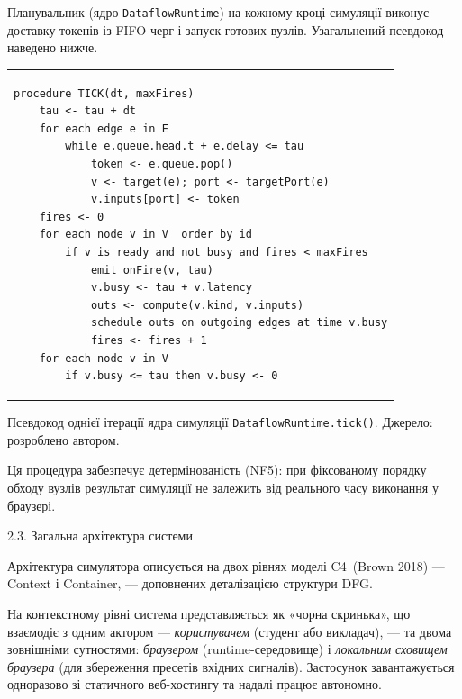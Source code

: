 Планувальник (ядро \texttt{DataflowRuntime}) на кожному кроці симуляції
виконує доставку токенів із FIFO-черг і запуск готових вузлів. Узагальнений
псевдокод наведено нижче.

{\def\LTcaptype{none}
\begin{longtable}[]{@{}
  >{\raggedright\arraybackslash}p{}@{}}
\toprule\noalign{}
\endhead
\bottomrule\noalign{}
\endlastfoot
\begin{minipage}[t]{\linewidth}\raggedright
\begin{verbatim}
procedure TICK(dt, maxFires)
    tau <- tau + dt
    for each edge e in E
        while e.queue.head.t + e.delay <= tau
            token <- e.queue.pop()
            v <- target(e); port <- targetPort(e)
            v.inputs[port] <- token
    fires <- 0
    for each node v in V  order by id
        if v is ready and not busy and fires < maxFires
            emit onFire(v, tau)
            v.busy <- tau + v.latency
            outs <- compute(v.kind, v.inputs)
            schedule outs on outgoing edges at time v.busy
            fires <- fires + 1
    for each node v in V
        if v.busy <= tau then v.busy <- 0
\end{verbatim}
\end{minipage} \\
\end{longtable}
}

Псевдокод однієї ітерації ядра симуляції
\texttt{DataflowRuntime.tick()}. Джерело: розроблено автором.

Ця процедура забезпечує детермінованість (NF5): при фіксованому порядку
обходу вузлів результат симуляції не залежить від реального часу
виконання у браузері.

\protect{}\label{_Toc228121457}{}2.3. Загальна архітектура
системи

Архітектура симулятора описується на двох рівнях моделі C4~(Brown 2018)
--- Context і Container, --- доповнених деталізацією структури DFG.

На контекстному рівні система представляється як «чорна скринька», що
взаємодіє з одним актором --- \emph{користувачем} (студент або
викладач), --- та двома зовнішніми сутностями: \emph{браузером}
(runtime-середовище) і \emph{локальним сховищем браузера} (для
збереження пресетів вхідних сигналів). Застосунок завантажується
одноразово зі статичного веб-хостингу та надалі працює автономно.


